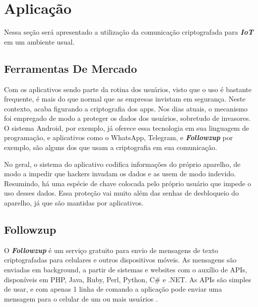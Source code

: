 \documentclass[12pt]{article}
\begin{document}
\section{Aplicação}

Nessa seção será apresentado a utilização da comunicação criptografada para \textbf{\textit{IoT}} em um ambiente usual.


\subsection{Ferramentas De Mercado}

Com os aplicativos sendo parte da rotina dos usuários, visto que o uso é bastante frequente, é mais do que normal que as empresas invistam em segurança. Neste contexto, acaba figurando a criptografia dos apps. Nos dias atuais, o mecanismo foi empregado de modo a proteger os dados dos usuários, sobretudo de invasores. O sistema Android, por exemplo, já oferece essa tecnologia em sua linguagem de programação, e aplicativos como o WhatsApp, Telegram, e \textit{\textbf{Followzup }}por exemplo, são  alguns dos que usam a criptografia em sua comunicação.

No geral, o sistema do aplicativo codifica informações do próprio aparelho, de modo a impedir que hackers invadam os dados e as usem de modo indevido. Resumindo, há uma espécie de chave colocada pelo próprio usuário que impede o uso desses dados. Essa proteção vai muito além das senhas de desbloqueio do aparelho, já que são mantidas por aplicativos.


\subsection{Followzup}

O \textit{\textbf{Followzup }}é um serviço gratuito para envio de mensagens de texto criptografadas para celulares e outros dispositivos móveis. As mensagens são enviadas em background, a partir de sistemas e websites com o auxílio de APIs, disponíveis em PHP, Java, Ruby, Perl, Python,  C\# e .NET. As APIs são simples de usar, e com apenas 1 linha de comando a aplicação pode enviar uma mensagem para o celular de um ou mais usuários \cite{followzup}.
\end{document}
